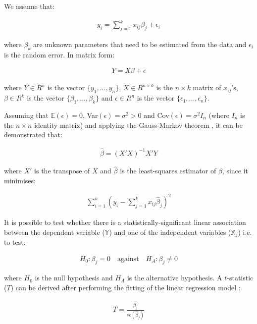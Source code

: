 We assume that:

\begin{align}
y_i = \sum_{j=1}^{k} x_{ij}\beta_j + \epsilon_i
\end{align} 

where $\beta_k$ are unknown parameters that need to be estimated from the data and $\epsilon_i$ is the random error. In matrix form:

\begin{align}
Y = X\beta + \epsilon
\end{align}

where  $Y \in R^n$ is the vector $\{y_1, ..., y_n\}$, $X \in R^{n \times k}$ is the $n \times k$ matrix of $x_{ij}$'s, $\beta \in R^k$ is the vector $\{\beta_1, ..., \beta_k\}$ and $\epsilon \in R^n$ is the vector $\{\epsilon_1, ..., \epsilon_n\}$.

\bigskip

Assuming that $\mathbb E(\epsilon)=0$, Var$(\epsilon)=\sigma^2 > 0$ and Cov$(\epsilon)= \sigma^2I_n$ (where $I_n$ is the $n \times n$ identity matrix) and applying the Gauss-Markov theorem \cite{Eaton2007}, it can be demonstrated that:

\begin{align}
\hat{\beta} = (X'X)^{-1}X'Y
\end{align}

where $X'$ is the transpose of $X$ and $\hat{\beta}$ is the least-squares estimator of $\beta$, since it minimises:

\begin{align}
\sum_{i=1}^{n} (y_i - \sum_{j=1}^{k} x_{ij}\hat{\beta}_j)^2
\end{align}

It is possible to test whether there is a statistically-significant linear association between the dependent variable ($\mathbb Y$) and one of the independent variables ($\mathbb X_j$) i.e. to test:

\begin{align}
H_0: \beta_j = 0 \quad \text{against} \quad H_A: \beta_j \ne 0
\end{align}
 
where $H_0$ is the null hypothesis and $H_A$ is the alternative hypothesis. A $t$-statistic ($T$) can be derived after performing the fitting of the linear regression model \cite{Sheather2009}:

\begin{align}
T=\frac{\hat{\beta}_j}{se(\hat{\beta}_j)} 
\end{align}

